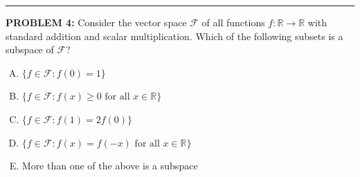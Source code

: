 \documentclass[12pt]{amsart}
\newcommand{\divider}{
  \vspace{-1em} %
  \noindent
  \raisebox{-0.15ex}{\textbullet}%
  \hspace{0.5em}%
  \rule[0.5ex]{0.95\textwidth}{1.0pt}%
  \hspace{0.5em}%
  \raisebox{-0.15ex}{\textbullet}%
  \vspace{0em} %
}
\begin{document}

\divider

{\bf PROBLEM 4:}
Consider the vector space $\mathcal{F}$ of all functions $f: \mathbb{R} \to \mathbb{R}$ with standard addition and scalar multiplication. Which of the following subsets is a subspace of $\mathcal{F}$?

\begin{enumerate}[(A)]
\item $\{f \in \mathcal{F} : f(0) = 1\}$
\item $\{f \in \mathcal{F} : f(x) \geq 0 \text{ for all } x \in \mathbb{R}\}$
\item $\{f \in \mathcal{F} : f(1) = 2f(0)\}$
\item $\{f \in \mathcal{F} : f(x) = f(-x) \text{ for all } x \in \mathbb{R}\}$
\item More than one of the above is a subspace
\end{enumerate}

\end{document}

